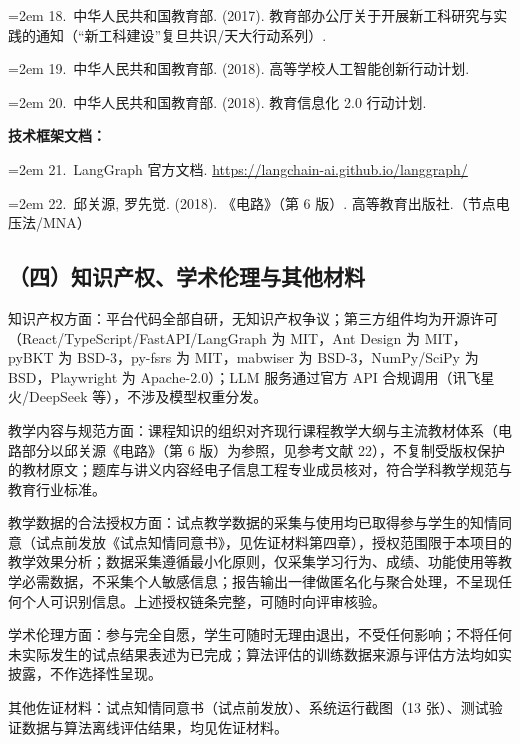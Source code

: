 \documentclass[zihao=-4,a4paper,UTF8,fontset=windows]{ctexart}
\begin{document}
\noindent\hangindent=2em 18.~中华人民共和国教育部. (2017). 教育部办公厅关于开展新工科研究与实践的通知（“新工科建设”复旦共识/天大行动系列）.



\noindent\hangindent=2em 19.~中华人民共和国教育部. (2018). 高等学校人工智能创新行动计划.



\noindent\hangindent=2em 20.~中华人民共和国教育部. (2018). 教育信息化 2.0 行动计划.



\textbf{技术框架文档：}



\noindent\hangindent=2em 21.~LangGraph 官方文档. \url{https://langchain-ai.github.io/langgraph/}



\noindent\hangindent=2em 22.~邱关源, 罗先觉. (2018). 《电路》（第 6 版）. 高等教育出版社.（节点电压法/MNA）

\subsection{（四）知识产权、学术伦理与其他材料}


知识产权方面：平台代码全部自研，无知识产权争议；第三方组件均为开源许可（React/TypeScript/FastAPI/LangGraph 为 MIT，Ant Design 为 MIT，pyBKT 为 BSD-3，py-fsrs 为 MIT，mabwiser 为 BSD-3，NumPy/SciPy 为 BSD，Playwright 为 Apache-2.0）；LLM 服务通过官方 API 合规调用（讯飞星火/DeepSeek 等），不涉及模型权重分发。



教学内容与规范方面：课程知识的组织对齐现行课程教学大纲与主流教材体系（电路部分以邱关源《电路》（第 6 版）为参照，见参考文献 22），不复制受版权保护的教材原文；题库与讲义内容经电子信息工程专业成员核对，符合学科教学规范与教育行业标准。

教学数据的合法授权方面：试点教学数据的采集与使用均已取得参与学生的知情同意（试点前发放《试点知情同意书》，见佐证材料第四章），授权范围限于本项目的教学效果分析；数据采集遵循最小化原则，仅采集学习行为、成绩、功能使用等教学必需数据，不采集个人敏感信息；报告输出一律做匿名化与聚合处理，不呈现任何个人可识别信息。上述授权链条完整，可随时向评审核验。

学术伦理方面：参与完全自愿，学生可随时无理由退出，不受任何影响；不将任何未实际发生的试点结果表述为已完成；算法评估的训练数据来源与评估方法均如实披露，不作选择性呈现。

其他佐证材料：试点知情同意书（试点前发放）、系统运行截图（13 张）、测试验证数据与算法离线评估结果，均见佐证材料。
\end{document}
